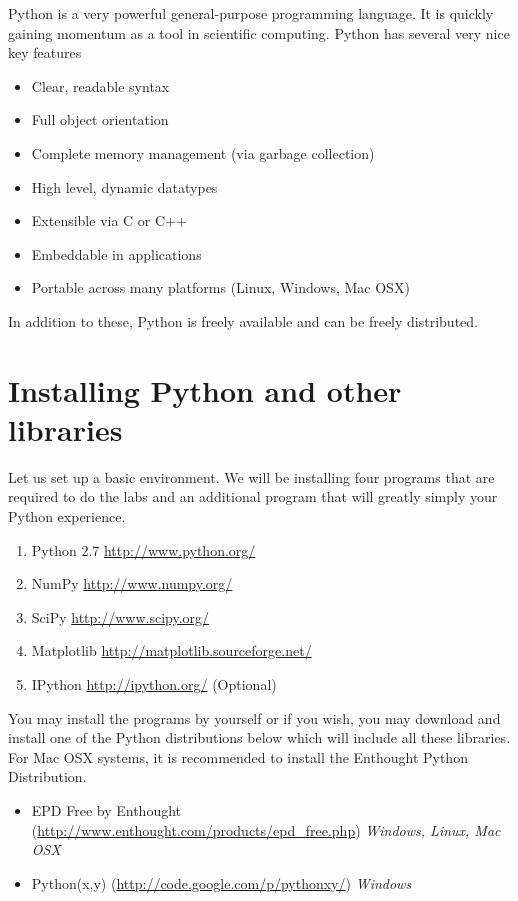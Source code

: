 \label{lab:Essential_Python}

Python is a very powerful general-purpose programming language. 
It is quickly gaining momentum as a tool in scientific computing.  
Python has several very nice key features
\begin{itemize}
\item Clear, readable syntax
\item Full object orientation
\item Complete memory management (via garbage collection)
\item High level, dynamic datatypes
\item Extensible via C or C++
\item Embeddable in applications
\item Portable across many platforms (Linux, Windows, Mac OSX)
\end{itemize}
In addition to these, Python is freely available and can be freely distributed.

\section*{Installing Python and other libraries}
Let us set up a basic environment.  
We will be installing four programs that are required to do the labs and an additional program that will greatly simply your Python experience.
\begin{enumerate}
\item Python 2.7 \url{http://www.python.org/}
\item NumPy \url{http://www.numpy.org/}
\item SciPy \url{http://www.scipy.org/}
\item Matplotlib \url{http://matplotlib.sourceforge.net/}
\item IPython \url{http://ipython.org/} (Optional)
\end{enumerate}
You may install the programs by yourself or if you wish, you may download and install one of the Python distributions below which will include all these libraries.  
For Mac OSX systems, it is recommended to install the Enthought Python Distribution.
\begin{itemize}
\item EPD Free by Enthought (\url{http://www.enthought.com/products/epd_free.php}) \emph{Windows, Linux, Mac OSX}
\item Python(x,y) (\url{http://code.google.com/p/pythonxy/}) \emph{Windows}
\end{itemize}

